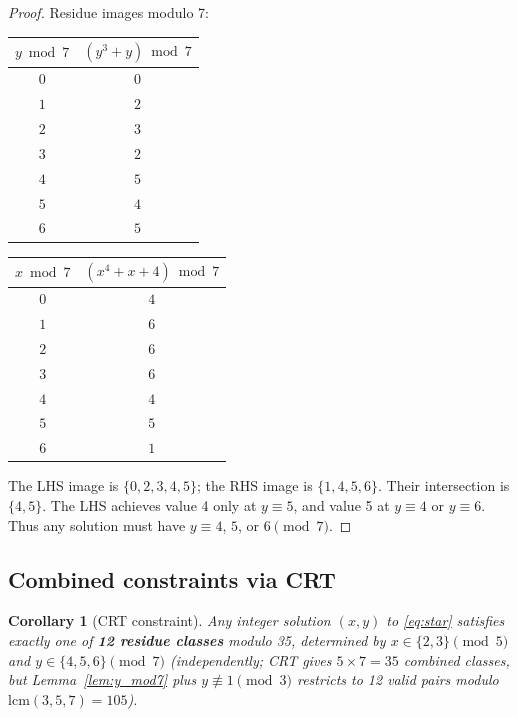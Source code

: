 \documentclass[12pt, a4paper]{article}
\newtheorem{corollary}[theorem]{Corollary}
\theoremstyle{definition}
\begin{document}
\begin{proof}
  Residue images modulo 7:

  \begin{center}
  \begin{tabular}{cc}
  \toprule
  $y \bmod 7$ & $(y^3+y) \bmod 7$ \\
  \midrule
  $0$ & $0$ \\
  $1$ & $2$ \\
  $2$ & $3$ \\
  $3$ & $2$ \\
  $4$ & $5$ \\
  $5$ & $4$ \\
  $6$ & $5$ \\
  \bottomrule
  \end{tabular}
  \qquad\qquad
  \begin{tabular}{cc}
  \toprule
  $x \bmod 7$ & $(x^4+x+4) \bmod 7$ \\
  \midrule
  $0$ & $4$ \\
  $1$ & $6$ \\
  $2$ & $6$ \\
  $3$ & $6$ \\
  $4$ & $4$ \\
  $5$ & $5$ \\
  $6$ & $1$ \\
  \bottomrule
  \end{tabular}
  \end{center}

  The LHS image is $\{0, 2, 3, 4, 5\}$; the RHS image is $\{1, 4, 5, 6\}$.
  Their intersection is $\{4, 5\}$.  The LHS achieves value 4 only at $y \equiv 5$,
  and value 5 at $y \equiv 4$ or $y \equiv 6$.
  Thus any solution must have $y \equiv 4$, $5$, or $6 \pmod 7$.
\end{proof}

\subsection{Combined constraints via CRT}

\begin{corollary}[CRT constraint]\label{cor:crt}
  Any integer solution $(x, y)$ to \eqref{eq:star} satisfies exactly one of
  \textbf{12 residue classes} modulo 35, determined by
  $x \in \{2, 3\} \pmod 5$ and $y \in \{4, 5, 6\} \pmod 7$
  (independently; CRT gives $5 \times 7 = 35$ combined classes, but Lemma~\ref{lem:y_mod7}
  plus\/ $y \not\equiv 1 \pmod 3$ restricts to 12 valid pairs modulo $\mathrm{lcm}(3,5,7) = 105$).
\end{corollary}
\end{document}
